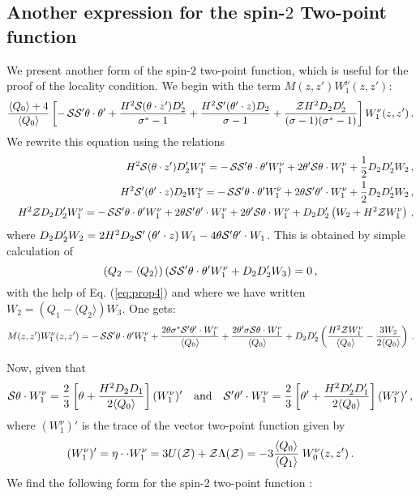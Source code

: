 \documentclass[a4paper,11pt,showpacs,preprintnumbers]{revtex4}
\def\z {{\cal Z}}
\begin{document}
\begin{appendix}
\section{Another expression for the spin-$2$ Two-point function}
We present another form of the spin-$2$ two-point function, which
is useful for the proof of the locality condition. We begin with
the term $M(z,z')W_{1}^{\nu}(z,z')$:
\begin{equation*}
\frac{\langle Q_{0}\rangle+4}{\langle Q_{0}\rangle }\left[-\,{\cal
S }{\cal S' } \theta\cdot\theta'+\frac{H^{2}{\cal S }(\theta\cdot
z')D'_{2}}{\sigma^{*}-1}+\frac{H^{2}{\cal S' }(\theta'\cdot
z)D_{2}}{\sigma-1}+\frac{\z H^{2}D_{2}D'_{2}}{
(\sigma-1)(\sigma^{*}-1)}\right]W_{1}^{\nu}(z,z')\,.
\end{equation*}
We rewrite this equation using the relations
\begin{eqnarray*}
&&H^{2}{\cal S }(\theta\cdot z')D'_{2} W_{1}^{\nu}=-\,{\cal S
}{\cal S' } \theta\cdot\theta'  W_{1}^{\nu}+2\theta' {\cal
S}\theta\cdot
W_{1}^{\nu}+\frac{1}{2}D_2D_2'W_{2}\,,\nonumber \\
&&H^{2}{\cal S }'(\theta'\cdot z)D_{2} W_{1}^{\nu}=-\,{\cal S
}{\cal S' } \theta\cdot\theta'  W_{1}^{\nu}+2\theta {\cal
S}'\theta'\cdot W_{1}^{\nu}+\frac{1}{2}D_2D_2'W_{2}\,, \nonumber\\
&&H^{2}\z D_2D'_{2} W_{1}^{\nu}=-\,{\cal S }{\cal S' }
\theta\cdot\theta' W_{1}^{\nu}+2\theta {\cal S}'\theta'\cdot
 W_{1}^{\nu}+2\theta' {\cal S}\theta\cdot
W_{1}^{\nu} +D_2D_2'\left(W_{2}+H^{2}\z W_{1}^{\nu}\right)\,,
\end{eqnarray*}
where $D_2D_2' W_{2}=2H^{2}D_{2}{\cal S}'\left(\theta'\cdot z
\right)W_1 -4\theta{\cal S}'\theta'\cdot W_1$. This is obtained by
simple calculation of
$$
\left(Q_{2}-\langle Q_2\rangle\right) \left({\cal S }{\cal S' }
\theta\cdot\theta' W_{1}^{\nu}+D_2 D_2'W_3\right)=0 \,,$$ with the
help of Eq. (\ref{eq:prop4}) and where we have written
$W_{2}=\left(Q_{1}-\langle Q_2\rangle\right)W_3$. One gets:
\begin{equation*}
M(z,z')W_{1}^{\nu}(z,z')= -\,{\cal S }{\cal S' }
\theta\cdot\theta'  W_{1}^{\nu}+\frac{2\theta\sigma^{*}{\cal
S}'\theta'\cdot
 W_{1}^{\nu}}{\langle
Q_0 \rangle} +\frac{2\theta' \sigma{\cal S}\theta\cdot
W_{1}^{\nu}}{\langle Q_0 \rangle} +D_2D_2'\left(\frac{H^{2}\z
W_{1}^{\nu}}{\langle Q_0 \rangle}-\frac{3W_{2}}{2\langle Q_0
\rangle}\right)\,.
\end{equation*}

Now, given that
\begin{equation*}\label{eq:prop2} {\cal
S}\theta\cdot W^{\nu}_{1}=\frac{2}{3}\left[
\theta+\frac{H^{2}D_{2}D_{1}}{2\langle Q_{0}\rangle}\right](
W^{\nu}_{1} )' \quad\mbox{and}\quad{\cal S}'\theta'\cdot
W^{\nu}_{1}=\frac{2}{3}\left[
\theta'+\frac{H^{2}D'_{2}D'_{1}}{2\langle
Q_{0}\rangle}\right](W^{\nu}_{1} )'\,,
\end{equation*}
where $(W_{1}^{\nu})'$ is the trace of the vector two-point
function given by
$$(W^{\nu}_{1})'=\eta\cdot\cdot  W^{\nu}_{1}=3U(\z)+\z\Lambda(\z)
=-3\frac{\langle Q_{0}\rangle}{\langle
Q_{1}\rangle}\;W^{\nu}_{0}(z,z')\,.
$$
We find the following form  for the spin-2 two-point function :


\end{appendix}
\end{document}
